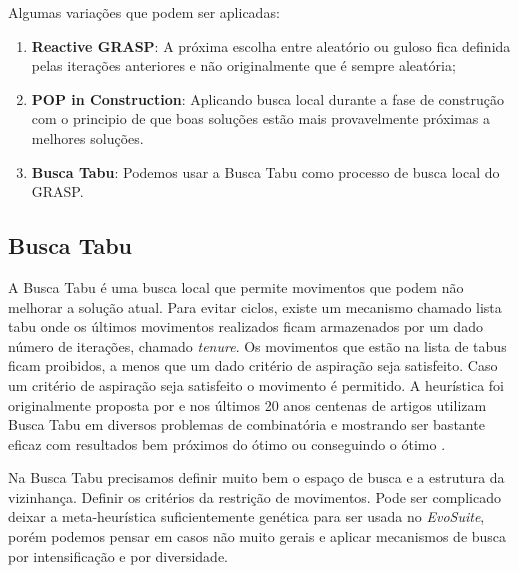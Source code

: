 \documentclass[conference]{IEEEtran}
\begin{document}
    Algumas variações que podem ser aplicadas:
    \begin{enumerate}

        \item \textbf{Reactive GRASP}: A próxima escolha entre aleatório ou guloso fica definida pelas iterações anteriores e não originalmente que é sempre aleatória;

        \item \textbf{POP in Construction}: Aplicando busca local durante a fase de construção com o principio de que boas soluções estão mais provavelmente próximas a melhores soluções.

        \item \textbf{Busca Tabu}: Podemos usar a Busca Tabu como processo de busca local do GRASP.
    \end{enumerate}




\subsection{Busca Tabu}
\label{sec:busca_tabu}

    A Busca Tabu é uma busca local que permite movimentos que podem não melhorar a solução atual. Para evitar ciclos, existe um mecanismo chamado lista tabu onde os últimos movimentos realizados
    ficam armazenados por um dado número de iterações, chamado \textit{tenure}. Os movimentos que estão na lista de tabus ficam proibidos, a menos que um dado critério de aspiração seja
    satisfeito. Caso um critério de aspiração seja satisfeito o movimento é permitido. A heurística foi originalmente proposta por \cite{glover1986future} \cite{glover1986future} e nos
    últimos 20 anos centenas de artigos utilizam Busca Tabu em diversos problemas de combinatória e mostrando ser bastante eficaz com resultados bem próximos do ótimo ou conseguindo o ótimo
    \cite{gendreau2010handbook}.

    Na Busca Tabu precisamos definir muito bem o espaço de busca e a estrutura da vizinhança. Definir os critérios da restrição de movimentos. Pode ser complicado deixar a meta-heurística
    suficientemente genética para ser usada no \emph{EvoSuite}, porém podemos pensar em casos não muito gerais e aplicar mecanismos de busca por intensificação e por diversidade.
\end{document}
